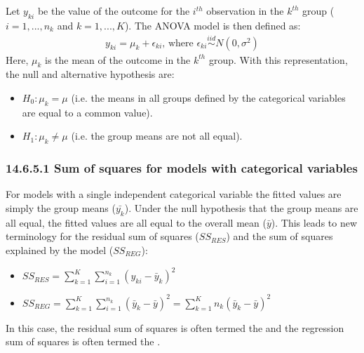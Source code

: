 \documentclass[letterpaper,10pt,english]{jupyterBook}
\begin{document}
\sphinxAtStartPar
Let \(y_{ki}\) be the value of the outcome for the \(i^{th}\) observation in the \(k^{th}\) group (\(i=1,...,n_k\) and \(k=1,...,K\)). The ANOVA model is then defined as:
\begin{equation*}
\begin{split}
y_{ki}=\mu_k + \epsilon_{ki} \text{, where } \epsilon_{ki} \overset{iid}{\sim} N(0,\sigma^2)
\end{split}
\end{equation*}
\sphinxAtStartPar
Here, \(\mu_k\) is the mean of the outcome in the \(k^{th}\) group. With this representation, the null and alternative hypothesis are:
\begin{itemize}
\item {} 
\sphinxAtStartPar
\(H_0: \mu_k= \mu\) (i.e. the means in all groups defined by the categorical variables are equal to a common value).

\item {} 
\sphinxAtStartPar
\(H_1: \mu_k \neq \mu\) (i.e. the group means are not all equal).

\end{itemize}


\subsubsection{14.6.5.1 Sum of squares for models with categorical variables}
\label{\detokenize{14.g. Linear Regression III:sum-of-squares-for-models-with-categorical-variables}}
\sphinxAtStartPar
For models with a single independent categorical variable the fitted values are simply the group means (\(\bar{y_k}\)). Under the null hypothesis that the group means are all equal, the fitted values are all equal to the overall mean (\(\bar{y}\)). This leads to new terminology for the residual sum of squares (\(SS_{RES}\)) and the sum of squares explained by the model (\(SS_{REG}\)):
\begin{itemize}
\item {} 
\sphinxAtStartPar
\(SS_{RES} = \sum_{k=1}^K \sum_{i=1}^{n_k} (y_{ki} - \bar{y}_k)^2\)

\item {} 
\sphinxAtStartPar
\(SS_{REG} = \sum_{k=1}^K \sum_{i=1}^{n_k} (\bar{y}_k - \bar{y})^2 = \sum_{k=1}^K n_k (\bar{y}_k - \bar{y})^2 \)

\end{itemize}

\sphinxAtStartPar
In this case, the residual sum of squares is often termed the  and the regression sum of squares is often termed the .
\end{document}

